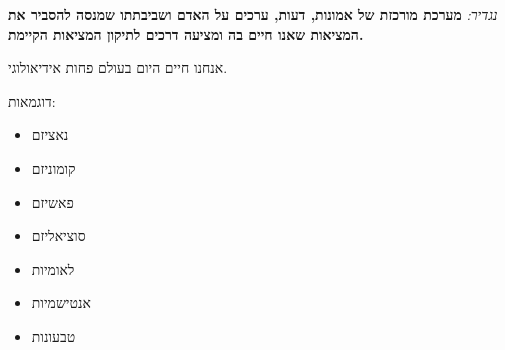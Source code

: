 \documentclass[]{article}
\begin{document}
	\textit{נגדיר: }\textbf{מערכת מורכזת של אמונות, דעות, ערכים על האדם ושביבתתו שמנסה להסביר את המציאות שאנו חיים בה ומציעה דרכים לתיקון המציאות הקיימת. }
	
	אנחנו חיים היום בעולם פחות אידיאולוגי. 
	
	דוגמאות: 
	\begin{multicols}{2}
		\begin{itemize}
			\item נאציזם
			\item קומוניזם
			\item פאשיזם
			\item סוציאליזם
			\item לאומיות
			\item אנטישמיות
			\item טבעונות
		\end{itemize}
	\end{multicols}
	
	
\end{document}
